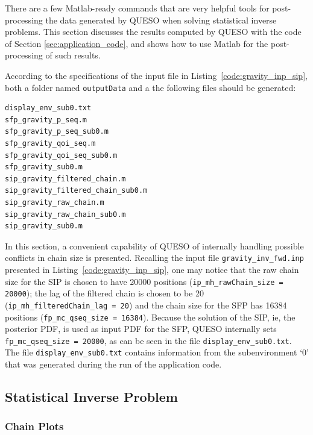 There are a few Matlab-ready commands that are very helpful tools for post-processing the data generated by QUESO when solving statistical inverse problems.
This section discusses the results computed by QUESO with the code of Section \ref{sec:application_code}, and shows how to use Matlab for the post-processing of such results. 

According to the specifications of the input file in Listing~\ref{code:gravity_inp_sip}, both a folder named \verb+outputData+ and a the following files should be generated:
\begin{verbatim}
display_env_sub0.txt  
sfp_gravity_p_seq.m   
sfp_gravity_p_seq_sub0.m  
sfp_gravity_qoi_seq.m 
sfp_gravity_qoi_seq_sub0.m  
sfp_gravity_sub0.m
sip_gravity_filtered_chain.m  
sip_gravity_filtered_chain_sub0.m 
sip_gravity_raw_chain.m    
sip_gravity_raw_chain_sub0.m
sip_gravity_sub0.m 
\end{verbatim}



%

In this section, a convenient capability of QUESO of internally handling possible conflicts in chain size is presented. Recalling the input file \verb+gravity_inv_fwd.inp+ presented in Listing~\ref{code:gravity_inp_sip}, one may notice that  the raw chain size for the SIP is chosen to have 20000 positions (\verb+ip_mh_rawChain_size = 20000+); the lag of the filtered chain is chosen to be 20 (\verb+ip_mh_filteredChain_lag = 20+) and the chain size for the SFP has 16384 positions (\verb+fp_mc_qseq_size = 16384+). Because the solution of the SIP, ie, the posterior PDF, is used as input PDF for the SFP, QUESO internally sets \verb+fp_mc_qseq_size = 20000+, as can be seen in the file \verb+display_env_sub0.txt+.  The file \verb+display_env_sub0.txt+ contains information from the subenvironment `0' that was generated during the run of the application code.

\subsection{Statistical Inverse Problem}


\subsubsection{Chain Plots}

